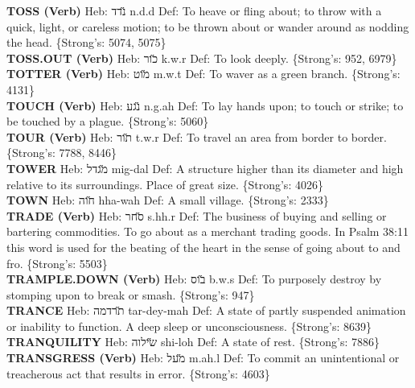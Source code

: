 {\textbf{TOSS (Verb)} Heb: {\large\H נדד} n.d.d Def: To heave or fling about; to throw with a quick, light, or careless motion; to be thrown about or wander around as nodding the head. \{Strong's: 5074, 5075\}\hfill{}\\

\textbf{TOSS.OUT (Verb)} Heb: {\large\H כור} k.w.r Def: To look deeply. \{Strong's: 952, 6979\}\hfill{}\\

\textbf{TOTTER (Verb)} Heb: {\large\H מוט} m.w.t Def: To waver as a green branch. \{Strong's: 4131\}\hfill{}\\

\textbf{TOUCH (Verb)} Heb: {\large\H נגע} n.g.ah Def: To lay hands upon; to touch or strike; to be touched by a plague. \{Strong's: 5060\}\hfill{}\\

\textbf{TOUR (Verb)} Heb: {\large\H תור} t.w.r Def: To travel an area from border to border. \{Strong's: 7788, 8446\}\hfill{}\\

\textbf{TOWER} Heb: {\large\H מגדל} mig-dal Def: A structure higher than its diameter and high relative to its surroundings. Place of great size. \{Strong's: 4026\}\hfill{}\\

\textbf{TOWN} Heb: {\large\H חוה} hha-wah Def: A small village. \{Strong's: 2333\}\hfill{}\\

\textbf{TRADE (Verb)} Heb: {\large\H סחר} s.hh.r Def: The business of buying and selling or bartering commodities. To go about as a merchant trading goods. In Psalm 38:11 this word is used for the beating of the heart in the sense of going about to and fro. \{Strong's: 5503\}\hfill{}\\

\textbf{TRAMPLE.DOWN (Verb)} Heb: {\large\H בוס} b.w.s Def: To purposely destroy by stomping upon to break or smash. \{Strong's: 947\}\hfill{}\\

\textbf{TRANCE} Heb: {\large\H תרדמה} tar-dey-mah Def: A state of partly suspended animation or inability to function. A deep sleep or unconsciousness. \{Strong's: 8639\}\hfill{}\\

\textbf{TRANQUILITY} Heb: {\large\H שילוה} shi-loh Def: A state of rest. \{Strong's: 7886\}\hfill{}\\

\textbf{TRANSGRESS (Verb)} Heb: {\large\H מעל} m.ah.l Def: To commit an unintentional or treacherous act that results in error. \{Strong's: 4603\}\hfill{}\\

}
